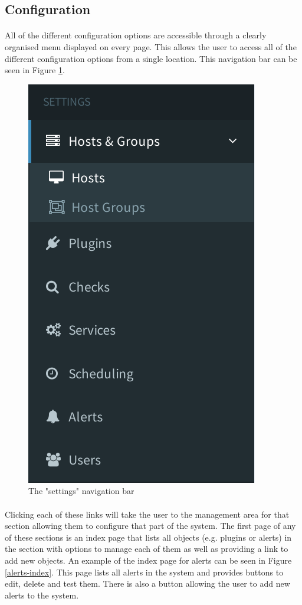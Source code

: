 \documentclass[bsc,logo,twoside]{infthesis}
\begin{document}
\subsection{Configuration}
\paragraph*{}
	All of the different configuration options are accessible through a clearly
	organised menu displayed on every page.  This allows the user to access all of
	the different configuration options from a single location.  This navigation
	bar can be seen in Figure \ref{settings-nav}.

\begin{figure}[H]
	\centering
	\caption{The "settings" navigation bar}
	\label{settings-nav}
	\includegraphics[scale=0.7]{assets/screenshots/settings-nav.pdf}
\end{figure}
	
\paragraph*{}
	Clicking each of these links will take the user to the management area for
	that section allowing them to configure that part of the system.  The first
	page of any of these sections is an index page that lists all objects (e.g.
	plugins or alerts) in the section with options to manage each of them as well
	as providing a link to add new objects.  An example of the index page for
	alerts can be seen in Figure \ref{alerts-index}.  This page lists all alerts
	in the system and provides buttons to edit, delete and test them. There is
	also a button allowing the user to add new alerts to the system.
	
\end{document}
